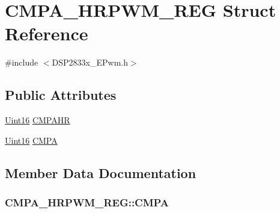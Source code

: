 \hypertarget{struct_c_m_p_a___h_r_p_w_m___r_e_g}{}\section{C\+M\+P\+A\+\_\+\+H\+R\+P\+W\+M\+\_\+\+R\+E\+G Struct Reference}
\label{struct_c_m_p_a___h_r_p_w_m___r_e_g}


{\ttfamily \#include $<$D\+S\+P2833x\+\_\+\+E\+Pwm.\+h$>$}

\subsection*{Public Attributes}
\begin{DoxyCompactItemize}
\item 
\hyperlink{_d_s_p2833x___device_8h_a59a9f6be4562c327cbfb4f7e8e18f08b}{Uint16} \hyperlink{struct_c_m_p_a___h_r_p_w_m___r_e_g_ab0aabc0d6e9e25a559871667882df392}{C\+M\+P\+A\+H\+R}
\item 
\hyperlink{_d_s_p2833x___device_8h_a59a9f6be4562c327cbfb4f7e8e18f08b}{Uint16} \hyperlink{struct_c_m_p_a___h_r_p_w_m___r_e_g_addf36405fb05f157b30dabf3e7a88c51}{C\+M\+P\+A}
\end{DoxyCompactItemize}


\subsection{Member Data Documentation}
\hypertarget{struct_c_m_p_a___h_r_p_w_m___r_e_g_addf36405fb05f157b30dabf3e7a88c51}{}
\subsubsection[{C\+M\+P\+A}]{ C\+M\+P\+A\+\_\+\+H\+R\+P\+W\+M\+\_\+\+R\+E\+G\+::\+C\+M\+P\+A}\label{struct_c_m_p_a___h_r_p_w_m___r_e_g_addf36405fb05f157b30dabf3e7a88c51}
\hypertarget{struct_c_m_p_a___h_r_p_w_m___r_e_g_ab0aabc0d6e9e25a559871667882df392}{}
